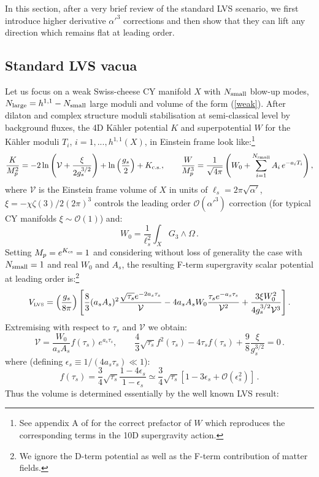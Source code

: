 \documentclass[11pt,a4paper]{article}
\newcommand{\be}{\begin{equation}}
\newcommand{\ee}{\end{equation}}
\def\LVS{{\scriptscriptstyle \rm LVS}}
\newcommand\vo{{\mathcal{V}}}
\newcommand{\mc}{\mathcal}
\begin{document}
In this section, after a very brief review of the standard LVS scenario, we first introduce higher derivative $\alpha'^3$ corrections and then show that they can lift any direction which remains flat at leading order. 

\subsection{Standard LVS vacua}

Let us focus on a weak Swiss-cheese CY manifold $X$ with $N_{\rm small}$ blow-up modes, $N_{\rm large}=h^{1,1}-N_{\rm small}$ large moduli and volume of the form (\ref{weak}). After dilaton and complex structure moduli stabilisation at semi-classical level by background fluxes, the 4D K\"ahler potential $K$ and superpotential $W$ for the K\"ahler moduli $T_i$, $i=1,...,h^{1,1}(X)$, in Einstein frame look like:\footnote{See appendix A of \cite{Burgess:2010bz} for the correct prefactor of $W$ which reproduces the corresponding terms in the 10D supergravity action.}
\be
\frac{K}{M_p^2} = -2\ln\left(\vo+\frac{\xi}{2 g_s^{3/2}}\right)+\ln\left(\frac{g_s}{2}\right)+K_{\rm c.s.},\qquad 
\frac{W}{M_p^3}=\frac{1}{\sqrt{4\pi}}\left(W_0+\sum_{i=1}^{N_{\rm small}} A_i\,e^{-a_i T_i}\right),
\label{4DEFT}
\ee
where $\vo$ is the Einstein frame volume of $X$ in units of $\ell_s=2\pi\sqrt{\alpha'}$, $\xi= -\chi\zeta(3)/2(2\pi)^3$ controls the leading order $\mc{O}(\alpha'^3)$ correction (for typical CY manifolds $\xi\sim \mc{O}(1)$) and:
\be
W_0 = \frac{1}{\ell_s^2}\int_X G_3\wedge \Omega\,.
\ee
Setting $M_p=e^{K_{\rm cs}}=1$ and considering without loss of generality the case with $N_{\rm small}=1$ and real $W_0$ and $A_s$, the resulting F-term supergravity scalar potential at leading order is:\footnote{We ignore the D-term potential as well as the F-term contribution of matter fields.}
\be
V_\LVS = \left(\frac{g_s}{8\pi}\right)\left[\frac83 (a_s A_s)^{2}\frac{\sqrt{\tau_s} e^{-2a_s\tau_s}}{\vo}- 4 a_s A_s W_0\frac{\tau_s e^{-a_s\tau_s}}{\vo^2}  + \frac{3\xi W_0^2}{4 g_s^{3/2} \vo^3}\right].
\label{VLVS}
\ee 
Extremising with respect to $\tau_s$ and $\vo$ we obtain: 
\be
\vo = \frac{W_0}{a_s A_s}f(\tau_s)\,e^{a_s\tau_s},
\qquad \frac43\sqrt{\tau_s}f^2(\tau_s)-4\tau_s f(\tau_s)+\frac98 \frac{\xi}{g_s^{3/2}} = 0\,.
\label{extreme}
\ee
where (defining $\epsilon_s\equiv 1/(4 a_s\tau_s)\ll 1$):
\be
f(\tau_s) = \frac34 \sqrt{\tau_s}\frac{1-4\epsilon_s}{1-\epsilon_s}\simeq\frac34\sqrt{\tau_s}\left[1-3\epsilon_s+\mc{O}\left(\epsilon_s^2\right)\right]\,.
\label{eq:ftau}
\ee
Thus the volume is determined essentially by the well known LVS result:
\end{document}
